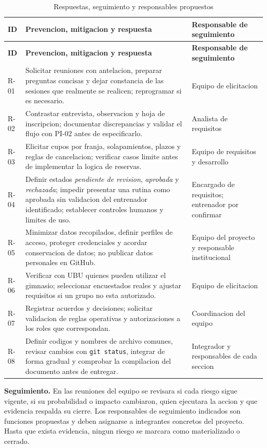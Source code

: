 \begingroup
\small
\renewcommand{\arraystretch}{1.2}
\begin{longtable}{|p{1.0cm}|p{9.0cm}|p{3.05cm}|}
\caption{Respuestas, seguimiento y responsables propuestos}\label{tab:respuesta-riesgos}\\\hline
\textbf{ID} & \textbf{Prevencion, mitigacion y respuesta} & \textbf{Responsable de seguimiento} \\ \hline
\endfirsthead
\hline \textbf{ID} & \textbf{Prevencion, mitigacion y respuesta} & \textbf{Responsable de seguimiento} \\ \hline
\endhead
R-01 & Solicitar reuniones con antelacion, preparar preguntas concisas y dejar constancia de las sesiones que realmente se realicen; reprogramar si es necesario. & Equipo de elicitacion \\ \hline
R-02 & Contrastar entrevista, observacion y hoja de inscripcion; documentar discrepancias y validar el flujo con PI-02 antes de especificarlo. & Analista de requisitos \\ \hline
R-03 & Elicitar cupos por franja, solapamientos, plazos y reglas de cancelacion; verificar casos limite antes de implementar la logica de reservas. & Equipo de requisitos y desarrollo \\ \hline
R-04 & Definir estados \emph{pendiente de revision}, \emph{aprobada} y \emph{rechazada}; impedir presentar una rutina como aprobada sin validacion del entrenador identificado; establecer controles humanos y limites de uso. & Encargado de requisitos; entrenador por confirmar \\ \hline
R-05 & Minimizar datos recopilados, definir perfiles de acceso, proteger credenciales y acordar conservacion de datos; no publicar datos personales en GitHub. & Equipo del proyecto y responsable institucional \\ \hline
R-06 & Verificar con UBU quienes pueden utilizar el gimnasio; seleccionar encuestados reales y ajustar requisitos si un grupo no esta autorizado. & Equipo de elicitacion \\ \hline
R-07 & Registrar acuerdos y decisiones; solicitar validacion de reglas operativas y autorizaciones a los roles que correspondan. & Coordinacion del equipo \\ \hline
R-08 & Definir codigos y nombres de archivo comunes, revisar cambios con \texttt{git status}, integrar de forma gradual y comprobar la compilacion del documento antes de entregar. & Integrador y responsables de cada seccion \\ \hline
\end{longtable}
\endgroup

\noindent\textbf{Seguimiento.} En las reuniones del equipo se revisara si cada riesgo sigue vigente, si su probabilidad o impacto cambiaron, quien ejecutara la accion y que evidencia respalda su cierre. Los responsables de seguimiento indicados son funciones propuestas y deben asignarse a integrantes concretos del proyecto. Hasta que exista evidencia, ningun riesgo se marcara como materializado o cerrado.
